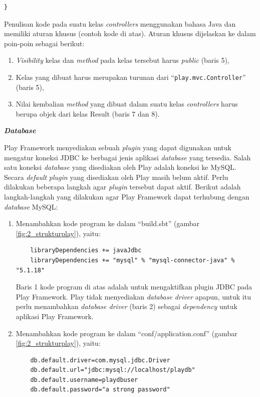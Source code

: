 \documentclass[a4paper,twoside]{article}
\begin{document}
\begin{enumerate}
\begin{itemize}
\begin{lstlisting}
}
\end{lstlisting}

Penulisan kode pada suatu kelas \textit{controllers} menggunakan bahasa Java dan memiliki aturan khusus (contoh kode di atas). Aturan khusus dijelaskan ke dalam poin-poin sebagai berikut:
\begin{enumerate}
	\item \textit{Visibility} kelas dan \textit{method} pada kelas tersebut harus \textit{public} (baris 5),
	\item Kelas yang dibuat harus merupakan turunan dari ``\texttt{play.mvc.Controller}'' (baris 5),
	\item Nilai kembalian \textit{method} yang dibuat dalam suatu kelas \textit{controllers} harus berupa objek dari kelas Result (baris 7 dan 8).
\end{enumerate}
	
\textbf{\textit{Database}}

Play Framework menyediakan sebuah \textit{plugin} yang dapat digunakan untuk mengatur koneksi JDBC ke berbagai jenis aplikasi \textit{database} yang tersedia\cite{playframeworkweb}. Salah satu koneksi \textit{database} yang disediakan oleh Play adalah koneksi ke MySQL. Secara \textit{default} \textit{plugin} yang disediakan oleh Play masih belum aktif. Perlu dilakukan beberapa langkah agar \textit{plugin} tersebut dapat aktif. Berikut adalah langkah-langkah yang dilakukan agar Play Framework dapat terhubung dengan \textit{database} MySQL:
\begin{enumerate}
	\item Menambahkan kode program ke dalam ``build.sbt'' (gambar \ref{fig:2_strukturplay}), yaitu:
	
	\begin{lstlisting}
	libraryDependencies += javaJdbc
	libraryDependencies += "mysql" % "mysql-connector-java" % "5.1.18"
	\end{lstlisting}
	
	Baris 1 kode program di atas adalah untuk mengaktifkan plugin JDBC pada Play Framework. Play tidak menyediakan \textit{database driver} apapun, untuk itu perlu menambahkan \textit{database driver} (baris 2) sebagai \textit{dependency} untuk aplikasi Play Framework.
	
	\item Menambahkan kode program ke dalam ``conf/application.conf'' (gambar \ref{fig:2_strukturplay}), yaitu:
	
	\begin{lstlisting}
	db.default.driver=com.mysql.jdbc.Driver
	db.default.url="jdbc:mysql://localhost/playdb"
	db.default.username=playdbuser
	db.default.password="a strong password"
	\end{lstlisting}
	

\end{enumerate}
\end{itemize}
\end{enumerate}
\end{document}
